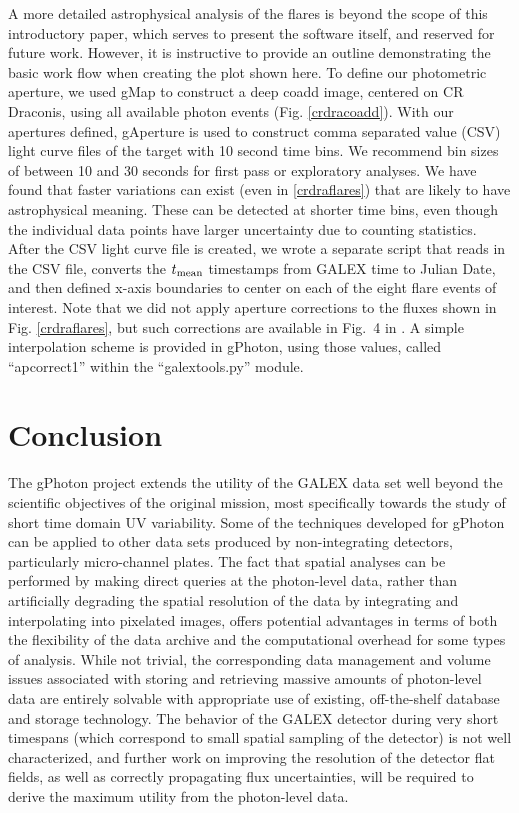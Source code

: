 \documentclass[preprint]{aastex}
\begin{document}
A more detailed astrophysical analysis of the flares is beyond the scope of this introductory paper, which serves to present the software itself, and reserved for future work.  However, it is instructive to provide an outline demonstrating the basic work flow when creating the plot shown here. To define our photometric aperture, we used gMap to construct a deep coadd image, centered on CR Draconis, using all available photon events (Fig. \ref{crdracoadd}). With our apertures defined, gAperture is used to construct comma separated value (CSV) light curve files of the target with 10 second time bins. We recommend bin sizes of between 10 and 30 seconds for first pass or exploratory analyses. We have found that faster variations can exist (even in \ref{crdraflares}) that are likely to have astrophysical meaning. These can be detected at shorter time bins, even though the individual data points have larger uncertainty due to counting statistics. After the CSV light curve file is created, we wrote a separate script that reads in the CSV file, converts the $t_{\rm{mean}}$ timestamps from GALEX time to Julian Date, and then defined x-axis boundaries to center on each of the eight flare events of interest. Note that we did not apply aperture corrections to the fluxes shown in Fig. \ref{crdraflares}, but such corrections are available in Fig.\ 4 in \citet{mor2007}. A simple interpolation scheme is provided in gPhoton, using those values, called ``apcorrect1'' within the ``galextools.py'' module.

\section{Conclusion}
The gPhoton project extends the utility of the GALEX data set well beyond the scientific objectives of the original mission, most specifically towards the study of short time domain UV variability. Some of the techniques developed for gPhoton can be applied to other data sets produced by non-integrating detectors, particularly micro-channel plates. The fact that spatial analyses can be performed by making direct queries at the photon-level data, rather than artificially degrading the spatial resolution of the data by integrating and interpolating into pixelated images, offers potential advantages in terms of both the flexibility of the data archive and the computational overhead for some types of analysis. While not trivial, the corresponding data management and volume issues associated with storing and retrieving massive amounts of photon-level data are entirely solvable with appropriate use of existing, off-the-shelf database and storage technology. The behavior of the GALEX detector during very short timespans (which correspond to small spatial sampling of the detector) is not well characterized, and further work on improving the resolution of the detector flat fields, as well as correctly propagating flux uncertainties, will be required to derive the maximum utility from the photon-level data.
\end{document}
